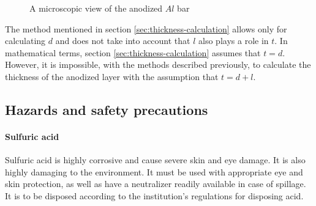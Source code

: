 \documentclass[a4paper]{article}
\begin{document}
\begin{figure}[ht]
  \centering
  \caption{A microscopic view of the anodized $Al$ bar}
  \label{fig:micro-al-bar}
\end{figure}
The method mentioned in section \ref{sec:thickness-calculation} allows only for
calculating $d$ and does not take into account that $l$ also plays a role in
$t$. In mathematical terms, section \ref{sec:thickness-calculation} assumes that
$t = d$. However, it is impossible, with the methods described previously, to
calculate the thickness of the anodized layer with the assumption that $t = d +
l$.

\subsection{Hazards and safety precautions} \label{sec:safety}

\paragraph{Sulfuric acid}
Sulfuric acid is highly corrosive and cause severe skin and eye damage. It is
also highly damaging to the environment. It must be used with appropriate eye
and skin protection, as well as have a neutralizer readily available in case of
spillage. It is to be disposed according to the institution's regulations for
disposing acid.
\end{document}
